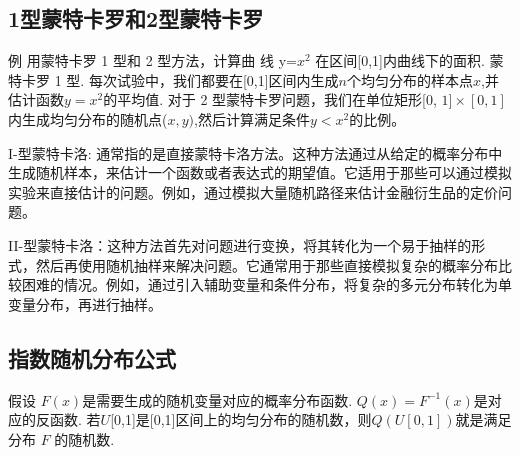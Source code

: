 \documentclass[UTF8,5pt,a4paper]{ctexart} %
\begin{document}
\begin{multicols}{4}



\subsection{1型蒙特卡罗和2型蒙特卡罗}
例  用蒙特卡罗 1 型和 2 型方法，计算曲
线 y=$x^{2}$ 在区间[0,1]内曲线下的面积.
蒙特卡罗 1 型. 每次试验中，我们都要在[0,1]区间内生成$n$个均匀分布的样本点$x$,并估计函数$y=x^2$的平均值. 
对于 2 型蒙特卡罗问题，我们在单位矩形[0, $1]\times[0,1]$内生成均匀分布的随机点($x,y)$,然后计算满足条件$y<x^2$的比例。

I-型蒙特卡洛: 通常指的是直接蒙特卡洛方法。这种方法通过从给定的概率分布中生成随机样本，来估计一个函数或者表达式的期望值。它适用于那些可以通过模拟实验来直接估计的问题。例如，通过模拟大量随机路径来估计金融衍生品的定价问题。

II-型蒙特卡洛：这种方法首先对问题进行变换，将其转化为一个易于抽样的形式，然后再使用随机抽样来解决问题。它通常用于那些直接模拟复杂的概率分布比较困难的情况。例如，通过引入辅助变量和条件分布，将复杂的多元分布转化为单变量分布，再进行抽样。
\subsection{指数随机分布公式}
假设 $F(x)$是需要生成的随机变量对应的概率分布函数. $Q(x)=F^{-1}(x)$是对应的反函数. 若$U$[0,1]是[0,1]区间上的均匀分布的随机数，则$Q(U[0,1])$就是满足分布 $F$ 的随机数. 

\end{multicols}
\end{document}
